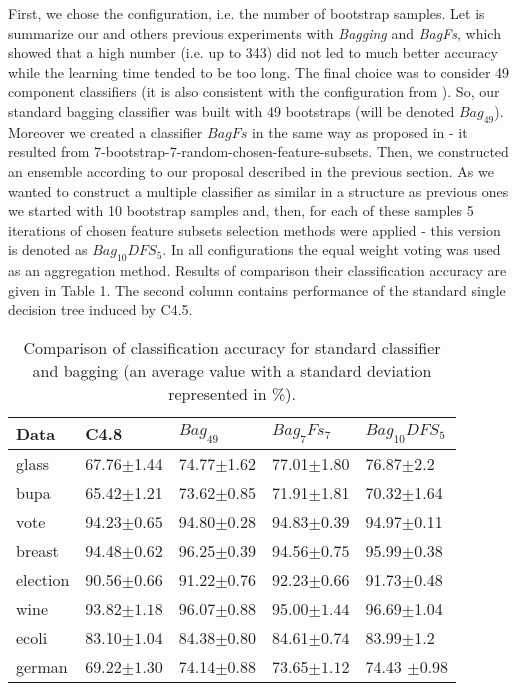 \documentclass[runningheads]{llncs}
\begin{document}
First, we chose the configuration, i.e. the number of bootstrap samples. Let
is summarize our and others previous experiments
\cite{lat1,Stef04,StefKacz04} with {\em Bagging} and {\em BagFs}, which
showed that a high number (i.e. up to 343) did not led to much better
accuracy while the learning time tended to be too long. The final choice was
to consider 49 component classifiers (it is also consistent with the
configuration from \cite{lat1}). So, our standard bagging classifier was
built with 49 bootstraps (will be denoted $Bag_{49}$).  Moreover we created
a classifier $BagFs$ in the same way as proposed in \cite{lat1} - it
resulted from 7-bootstrap-7-random-chosen-feature-subsets. Then, we
constructed an ensemble according to our proposal described in the previous
section. As we wanted to construct a multiple classifier as similar in a
structure as previous ones we started with 10 bootstrap samples and, then,
for each of these samples 5 iterations of chosen  feature subsets selection
methods were applied - this version is denoted as $Bag_{10}DFS_5$. In all
configurations  the  equal weight voting was used as an aggregation method.
Results of comparison their classification accuracy are given in Table 1.
The second column contains performance of the standard single decision tree
induced by C4.5.


\begin{table}
  \centering
\caption{Comparison of classification accuracy for standard classifier and
bagging (an average value with a standard deviation represented in \%).
\label{tab:c45bagbagfs_1}} \vspace{2pt}
\begin{tabular}{lllll}\hline
Data  & C4.8 & $Bag_{49}$ &  $Bag_7Fs_7$ & $Bag_{10}DFS_5$ \\ \hline
glass & 67.76\scriptsize{$\pm$1.44} & 74.77\scriptsize{$\pm$1.62} & 77.01\scriptsize{$\pm$1.80} &
76.87\scriptsize{$\pm$2.2}\\
bupa & 65.42\scriptsize{$\pm$1.21}&73.62\scriptsize{$\pm$0.85}& 71.91\scriptsize{$\pm$1.81} &
70.32\scriptsize{$\pm$1.64}\\
vote & 94.23\scriptsize${\pm0.65}$&94.80\scriptsize${\pm0.28}$&  94.83\scriptsize${\pm0.39}$ & 94.97\scriptsize{$\pm$0.11}\\
breast & 94.48\scriptsize${\pm0.62}$& 96.25\scriptsize${\pm0.39}$ &  94.56\scriptsize${\pm0.75}$ & 95.99\scriptsize{$\pm$0.38}\\
election & 90.56\scriptsize${\pm0.66}$&91.22\scriptsize${\pm0.76}$ &
92.23\scriptsize${\pm0.66}$ &  91.73\scriptsize{$\pm$0.48}\\
wine & 93.82\scriptsize${\pm1.18}$&96.07\scriptsize${\pm0.88}$
 &95.00\scriptsize${\pm1.44}$ & 96.69\scriptsize{$\pm$1.04} \\
ecoli&83.10\scriptsize${\pm1.04}$&84.38\scriptsize${\pm0.80}$ &
84.61\scriptsize${\pm0.74}$ &  83.99\scriptsize{$\pm$1.2}\\
german&69.22\scriptsize${\pm1.30}$& 74.14\scriptsize${\pm0.88}$&
73.65\scriptsize${\pm1.12}$ &  74.43 \scriptsize{$\pm$0.98}\\\hline
\end{tabular}
\end{table}
\end{document}
